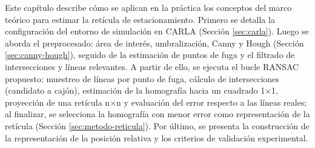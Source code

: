 
Este capítulo describe cómo se aplican en la práctica los conceptos del marco teórico 
para estimar la retícula de estacionamiento. Primero se detalla la configuración del 
entorno de simulación en CARLA (Sección \ref{sec:carla}). 
Luego se aborda el preprocesado: área de interés, umbralización, 
Canny y Hough (Sección \ref{sec:canny-hough}), seguido de la estimación de puntos de fuga 
y el filtrado de intersecciones y líneas relevantes. A partir de ello, 
se ejecuta el bucle RANSAC propuesto: muestreo de líneas por punto de fuga, cálculo de intersecciones 
(candidato a cajón), estimación de la homografía hacia un cuadrado 1×1, proyección de una retícula n×n 
y evaluación del error respecto a las líneas reales; al finalizar, se selecciona la homografía con menor 
error como representación de la retícula (Sección \ref{sec:metodo-reticula}). Por último, se presenta la 
construcción de la representación de la posición relativa y los criterios de validación experimental.